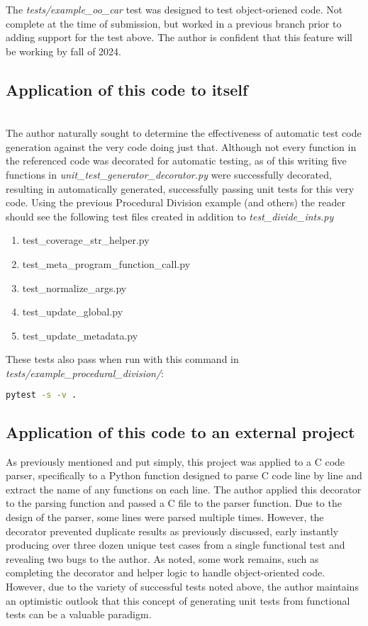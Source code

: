 The \textit{tests/example\_oo\_car} test was designed to test
object-oriened code. Not complete at the time of submission, but worked in a 
previous branch prior to adding support for the test above.
The author is confident that this feature will be working by 
fall of 2024.


%
\subsection{Application of this code to itself}\label{sec:eval-2}
\hfill\\
The author naturally sought to determine the effectiveness of automatic
test code generation against the very code doing just that.  Although not 
every function in the referenced code was decorated for automatic testing, 
as of this writing five functions in 
\textit{unit\_test\_generator\_decorator.py} were successfully decorated, 
resulting in automatically generated, successfully passing unit tests for this
very code.  Using the previous Procedural Division example (and others) 
the reader should see the following test files created in addition to 
\textit{test\_divide\_ints.py}

\begin{enumerate}
    \item test\_coverage\_str\_helper.py
    \item test\_meta\_program\_function\_call.py
    \item test\_normalize\_args.py
    \item test\_update\_global.py
    \item test\_update\_metadata.py
\end{enumerate}

These tests also pass when run with this command in \textit{tests/example\_procedural\_division/}:
\begin{lstlisting}[language=bash]
    pytest -s -v .
\end{lstlisting}

\subsection{Application of this code to an external project}\label{sec:eval-2}
As previously mentioned and put simply, this project was applied to a C code parser, 
specifically to a Python function designed to parse C code line by line
and extract the name of any functions on each line.  The author applied this
decorator to the parsing function and passed a C file to the parser function.
%
Due to the design of the parser, some lines were parsed multiple times.  
However, the decorator prevented duplicate results as previously discussed, 
early instantly producing over three dozen unique test cases 
from a single functional test and revealing two bugs to the author.
%
As noted, some work remains, such as completing the decorator and helper logic
to handle object-oriented code.  However, due to the variety of successful 
tests noted above, the author maintains an optimistic outlook that this concept
of generating unit tests from functional tests can be a valuable paradigm.

